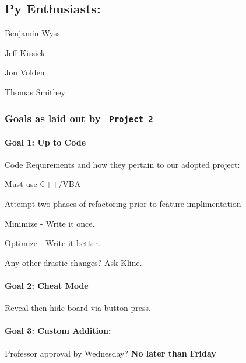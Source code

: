 \subsection*{Py Enthusiasts\+:}


\begin{DoxyEnumerate}
\item Benjamin Wyss
\item Jeff Kissick
\item Jon Volden
\item Thomas Smithey
\end{DoxyEnumerate}

\subsubsection*{Goals as laid out by \href{https://canvas.instructure.com/courses/1516832/assignments/10826093}{\texttt{ Project 2}}}

\paragraph*{Goal 1\+: Up to Code}

Code Requirements and how they pertain to our adopted project\+:
\begin{DoxyEnumerate}
\item Must use C++/\+V\+BA
\item Attempt two phases of refactoring prior to feature implimentation
\begin{DoxyItemize}
\item Minimize -\/ Write it once.
\item Optimize -\/ Write it better.
\end{DoxyItemize}
\item Any other drastic changes? Ask Kline.
\end{DoxyEnumerate}

\paragraph*{Goal 2\+: Cheat Mode}

Reveal then hide board via button press.

\paragraph*{Goal 3\+: Custom Addition\+:}

Professor approval by Wednesday? {\bfseries{No later than Friday}}

